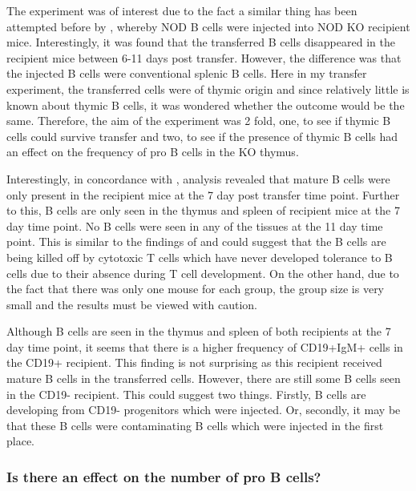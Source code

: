 The experiment was of interest due to the fact a similar thing has been attempted before by \citet{Serreze1998}, whereby NOD B cells were injected into NOD KO recipient mice.
Interestingly, it was found that the transferred B cells disappeared in the recipient mice between 6-11 days post transfer.
However, the difference was that the injected B cells were conventional splenic B cells.
Here in my transfer experiment, the transferred cells were of thymic origin and since relatively little is known about thymic B cells, it was wondered whether the outcome would be the same. 
Therefore, the aim of the experiment was 2 fold, one, to see if thymic B cells could survive transfer and two, to see if the presence of thymic B cells had an effect on the frequency of pro B cells in the KO thymus.

Interestingly, in concordance with \citet{Serreze1998}, analysis revealed that mature B cells were only present in the recipient mice at the 7 day post transfer time point.
Further to this, B cells are only seen in the thymus and spleen of recipient mice at the 7 day time point.
No B cells were seen in any of the tissues at the 11 day time point.
This is similar to the findings of \citet{Serreze1998} and could suggest that the B cells are being killed off by cytotoxic T cells which have never developed tolerance to B cells due to their absence during T cell development.
On the other hand, due to the fact that there was only one mouse for each group, the group size is very small and the results must be viewed with caution.

Although B cells are seen in the thymus and spleen of both recipients at the 7 day time point, it seems that there is a higher frequency of CD19+IgM+ cells in the CD19+ recipient.
This finding is not surprising as this recipient received mature B cells in the transferred cells.
However, there are still some B cells seen in the CD19- recipient.
This could suggest two things.
Firstly, B cells are developing from CD19- progenitors which were injected.
Or, secondly, it may be that these B cells were contaminating B cells which were injected in the first place.


\subsubsection{Is there an effect on the number of pro B cells?}

